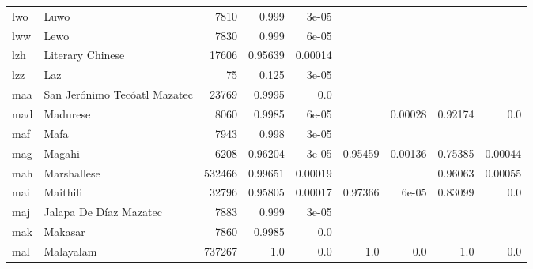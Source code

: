 \documentclass[11pt]{article}
\begin{document}
\begin{table*}[h]
{\begin{tabular}{llrrrrrrr}
lwo         & Luwo         & 7810         & 0.999         & 3e-05         &          &          &          &          \\

lww         & Lewo         & 7830         & 0.999         & 6e-05         &          &          &          &          \\

lzh         & Literary Chinese         & 17606         & 0.95639         & 0.00014         &          &          &          &          \\

lzz         & Laz         & 75         & 0.125         & 3e-05         &          &          &          &          \\

maa         & San Jerónimo Tecóatl Mazatec         & 23769         & 0.9995         & 0.0         &          &          &          &          \\

mad         & Madurese         & 8060         & 0.9985         & 6e-05         &          & 0.00028         & 0.92174         & 0.0         \\

maf         & Mafa         & 7943         & 0.998         & 3e-05         &          &          &          &          \\

mag         & Magahi         & 6208         & 0.96204         & 3e-05         & 0.95459         & 0.00136         & 0.75385         & 0.00044         \\

mah         & Marshallese         & 532466         & 0.99651         & 0.00019         &          &          & 0.96063         & 0.00055         \\

mai         & Maithili         & 32796         & 0.95805         & 0.00017         & 0.97366         & 6e-05         & 0.83099         & 0.0         \\

maj         & Jalapa De Díaz Mazatec         & 7883         & 0.999         & 3e-05         &          &          &          &          \\

mak         & Makasar         & 7860         & 0.9985         & 0.0         &          &          &          &          \\

mal         & Malayalam         & 737267         & 1.0         & 0.0         & 1.0         & 0.0         & 1.0         & 0.0         \\


\end{tabular}}
\end{table*}
\end{document}
